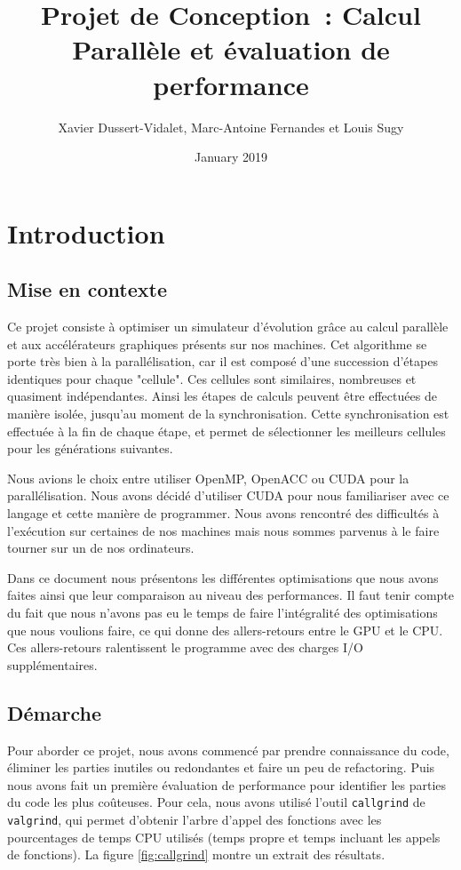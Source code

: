 \documentclass{article}
\title{Projet de Conception~: Calcul Parallèle et évaluation de performance}
\author{Xavier Dussert-Vidalet, Marc-Antoine Fernandes et Louis Sugy}
\date{January 2019}
\begin{document}
\maketitle

\setlength{\parskip}{1.5mm}

\tableofcontents
\newpage

\setlength{\parskip}{3mm}

\section{Introduction}
\subsection{Mise en contexte}

Ce projet consiste à optimiser un simulateur d'évolution grâce au calcul parallèle et aux accélérateurs graphiques présents sur nos machines. Cet algorithme se porte très bien à la parallélisation, car il est composé d'une succession d'étapes identiques pour chaque "cellule". Ces cellules sont similaires, nombreuses et quasiment indépendantes. Ainsi les étapes de calculs peuvent être effectuées de manière isolée, jusqu'au moment de la synchronisation. Cette synchronisation est effectuée à la fin de chaque étape, et permet de sélectionner les meilleurs cellules pour les générations suivantes.

Nous avions le choix entre utiliser OpenMP, OpenACC ou CUDA pour la parallélisation. Nous avons décidé d'utiliser CUDA pour nous familiariser avec ce langage et cette manière de programmer. Nous avons rencontré des difficultés à l'exécution sur certaines de nos machines mais nous sommes parvenus à le faire tourner sur un de nos ordinateurs.

Dans ce document nous présentons les différentes optimisations que nous avons faites ainsi que leur comparaison au niveau des performances. Il faut tenir compte du fait que nous n'avons pas eu le temps de faire l'intégralité des optimisations que nous voulions faire, ce qui donne des allers-retours entre le GPU et le CPU. Ces allers-retours ralentissent le programme avec des charges I/O supplémentaires.


\subsection{Démarche}

Pour aborder ce projet, nous avons commencé par prendre connaissance du code, éliminer les parties inutiles ou redondantes et faire un peu de refactoring. Puis nous avons fait un première évaluation de performance pour identifier les parties du code les plus coûteuses. Pour cela, nous avons utilisé l'outil \texttt{callgrind} de \texttt{valgrind}, qui permet d'obtenir l'arbre d'appel des fonctions avec les pourcentages de temps CPU utilisés (temps propre et temps incluant les appels de fonctions). La figure \ref{fig:callgrind} montre un extrait des résultats.
\end{document}
